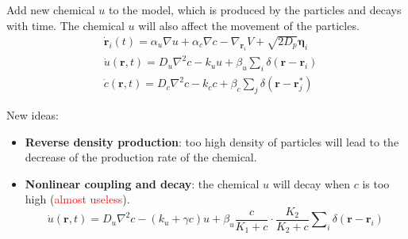\documentclass{article}
\begin{document}
Add new chemical $u$ to the model, which is produced by the particles and decays with time. The chemical $u$ will also affect the movement of the particles.
\begin{subequations}
    \begin{align}
        &\dot{\mathbf{r}}_i\left( t \right) =\alpha _u\nabla u+\alpha _c\nabla c-\nabla _{\mathbf{r}_i}V+\sqrt{2D_p}\mathbf{\eta }_i\\
        &\dot{u}\left( \mathbf{r},t \right) =D_u\nabla ^2c-k_uu+\beta _u\sum\nolimits_i^{}{\delta \left( \mathbf{r}-\mathbf{r}_i \right)}\\
        &\dot{c}\left( \mathbf{r},t \right) =D_c\nabla ^2c-k_cc+\beta _c\sum\nolimits_j^{}{\delta \left( \mathbf{r}-\mathbf{r}_{j}^{*} \right)}
    \end{align}
\end{subequations}

New ideas:
\begin{itemize}
    \item \textbf{Reverse density production}: too high density of particles will lead to the decrease of the production rate of the chemical.
    \item \textbf{Nonlinear coupling and decay}: the chemical $u$ will decay when $c$ is too high (\textcolor{red}{almost useless}).
    \begin{equation}
        \dot{u}\left( \mathbf{r},t \right) =D_u\nabla ^2c-\left( k_u+\gamma c \right) u+\beta _u\frac{c}{K_1+c}\cdot \frac{K_2}{K_2+c}\sum\nolimits_i^{}{\delta \left( \mathbf{r}-\mathbf{r}_i \right)}
    \end{equation}
\end{itemize}
\end{document}
